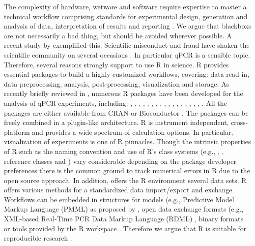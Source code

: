 The complexity of hardware, wetware and software require expertise to master a 
technical workflow comprising standards for experimental design, generation and 
analysis of data, interpretation of results and reporting 
\citep{huggett_BDQ_2014}. We argue that blackboxs are not necessarily a bad 
thing, but should be avoided wherever possible. A recent study by 
\citet{Duran_2014} exemplified this. Scientific misconduct and fraud have shaken 
the scientific community on several occasions \citep{fang_2012}. In particular 
qPCR is a sensible topic. Therefore, several reasons strongly support to use R in 
science. R provides essential packages to build a highly customized workflows, 
covering: data read-in, data preprocessing, analysis, post-processing, 
visualization and storage. As recently briefly reviewed in 
\citet{pabinger_2014}, numerous R packages have been developed for the analysis 
of qPCR experiments, including: , , 
, , , , 
, , , , 
, , , , 
, , , 
. All the packages are either available from CRAN or 
Bioconductor \citep{gentleman_2004}. The packages can be freely combined in a 
plugin-like architecture. R is instrument independent, cross-platform and 
provides a wide spectrum of calculation options. In particular, visualization of 
experiments is one of R pinnacles. Though the intrinsic properties of R such as 
the naming convention \citep{Baaaath_2012} and use of R's class systems (e.g., 
, , reference classes and ) vary considerable 
depending on the package developer preferences there is the common ground to track
numerical errors in R due to the open source approach. In addition, offers the R 
environment several data sets. R offers various methods for a standardized data 
import/export and exchange. Workflows can be embedded in structures for models 
(e.g., Predictive Model Markup Language (PMML) as proposed by 
\citet{Guazzelli_2009}, open data exchange formats (e.g., XML-based Real-Time 
PCR Data Markup Language (RDML) \citep{lefever_2009}, binary formats 
\citep{michna_2013} or tools provided by the R workspace \citep{RDCT2010c}. 
Therefore we argue that R is suitable for reproducible research 
\citep{Gesmann_2011, Murrell_2012, gandrud_2013, hofmann_2013, Leeper_2014, 
liu_2014}.

